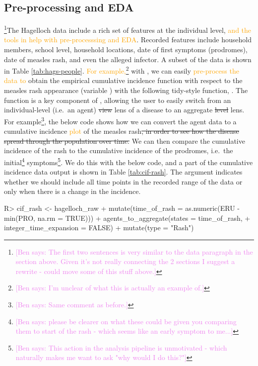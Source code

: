 \documentclass[
  shortnames]{jss}
\begin{document}
\subsection{Pre-processing and EDA}

\footnote{\textcolor{violet}{[Ben says: The first two sentences is very similar to the data paragraph in the section above. Given it's not really connecting the 2 sections I suggest a rewrite - could move some of this stuff above.]}}The
Hagelloch data include a rich set of features at the individual level,
\textcolor{orange}{and the tools in  help with pre-processsing and EDA}.
Recorded features include household members, school level, household
locations, date of first symptoms (prodromes), date of measles rash, and
even the alleged infector. A subset of the data is shown in Table
\ref{tab:hags-people}.
\textcolor{orange}{For example,}\footnote{\textcolor{violet}{[Ben says: I'm unclear of what this is actually an example of.]}}
with , we can easily
\textcolor{orange}{pre-process the data to} obtain the empirical
cumulative incidence function with respect to the measles rash
appearance (variable ) with the following tidy-style function,
. The function 
is a key component of , allowing the user to easily
switch from an individual-level (i.e.~an agent) \sout{view} lens of a
disease to an aggregate \sout{level} lens. For
example\footnote{\textcolor{violet}{[Ben says: Same comment as before.]}},
the below code shows how we can convert the agent data to a cumulative
incidence \textcolor{orange}{plot} of the measles
rash\sout{, in order to see how the disease spread through the population over time.}
We can then compare the cumulative incidence of the rash to the
cumulative incidence of the prodromes, i.e.~the
initial\footnote{\textcolor{violet}{[Ben says: please be clearer on what these could be given you comparing them to start of the rash - which seems like an early symptom to me...]}}
symptoms\footnote{\textcolor{violet}{[Ben says: This action in the analysis pipeline is unmotivated - which naturally makes me want to ask "why would I do this?"]}}.
We do this with the below code, and a part of the cumulative incidence
data output is shown in Table \ref{tab:cif-rash}. The argument
 indicates whether we should include all
time points in the recorded range of the data or only when there is a
change in the incidence.

\begin{CodeChunk}
\begin{CodeInput}
R> cif_rash  <- hagelloch_raw %
+   mutate(time_of_rash = as.numeric(ERU - min(PRO, na.rm = TRUE))) %
+   agents_to_aggregate(states = time_of_rash,
+                       integer_time_expansion = FALSE) %
+   mutate(type = "Rash")
\end{CodeInput}
\end{CodeChunk}
\end{document}
